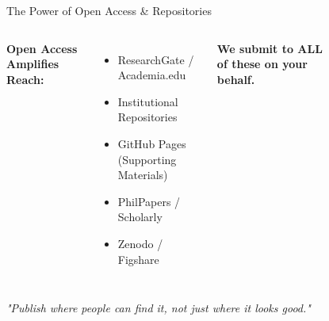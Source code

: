 \documentclass[10pt, aspectratio=169]{beamer}
\begin{document}
	\begin{frame}{The Power of Open Access \& Repositories}
		\begin{columns}
			\textbf{Open Access Amplifies Reach:}
			\begin{itemize}
				\item ResearchGate / Academia.edu
				\item Institutional Repositories
				\item GitHub Pages (Supporting Materials)
				\item PhilPapers / Scholarly
				\item Zenodo / Figshare
			\end{itemize}
			\vspace{0.3cm}
			\textcolor{myblue}{\textbf{We submit to ALL of these on your behalf.}}
			
			\begin{figure}
				\centering
			\end{figure}
		\end{columns}
		\vspace{0.3cm}
		\begin{center}
			\textit{"Publish where people can find it, not just where it looks good."}
		\end{center}
	\end{frame}
	
\end{document}
